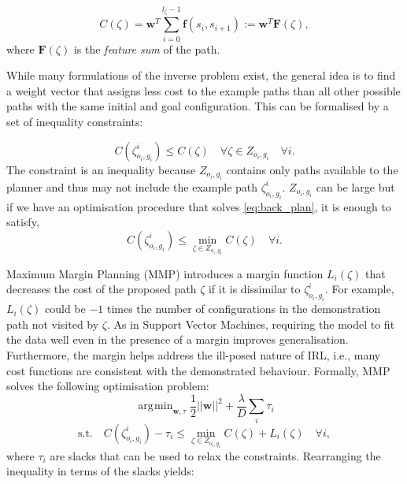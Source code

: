 \documentclass[a4paper,11pt]{report}
\DeclareMathOperator*{\argmin}{\arg\!\min}
\begin{document}
\begin{equation}
	C(\zeta) = \mathbf{w}^T\sum_{i=0}^{l_{\zeta}-1} \mathbf{f}(s_i,s_{i+1}) := \mathbf{w}^T \mathbf{F}(\zeta),
\end{equation}
where $\mathbf{F}(\zeta)$ is the \emph{feature sum} of the path.

While many formulations of the inverse problem exist, the general idea is to find a weight vector that assigns less cost to the example paths than all other possible paths with the same initial and goal configuration.  This can be formalised by a set of inequality constraints:

\begin{equation}
	C(\zeta^i_{o_i,g_i}) \leq  C(\zeta) \quad \forall \zeta \in Z_{o_i,g_i}  \quad \forall i. \label{eq:const1}
\end{equation}
The constraint is an inequality because $Z_{o_i,g_i}$ contains only paths available to the planner and thus may not include the example path $\zeta^i_{o_i,g_i}$.
$Z_{o_i,g_i}$ can be large but if we have an optimisation procedure that solves \eqref{eq:back_plan}, it is enough to satisfy, 
\begin{equation}
	C(\zeta^i_{o_i,g_i}) \leq \min_{\zeta \in Z_{o_i,g_i}} C(\zeta) \quad \forall i. \label{eq:const}
\end{equation}

Maximum Margin Planning (MMP) \cite{ratliff2006maximum} introduces a margin function $L_i(\zeta)$ that decreases the cost of the proposed path $\zeta$ if it is dissimilar to $\zeta^i_{o_i,g_i}$. For example, $L_i(\zeta)$ could be $-1$ times the number of configurations in the demonstration path not visited by $\zeta$. As in Support Vector Machines, requiring the model to fit the data well even in the presence of a margin improves generalisation. Furthermore, the margin helps address the ill-posed nature of IRL, i.e., many cost functions are consistent with the demonstrated behaviour. Formally, MMP solves the following optimisation problem:
\begin{equation}
	\argmin_{\mathbf{w},\tau} \frac{1}{2}||\mathbf{w}||^2 + \frac{\lambda}{D} \sum_i \tau_i \label{eq:mas_marg}
\end{equation}
\begin{equation}
	\text{s.t.} \quad C(\zeta^i_{o_i,g_i}) - \tau_i \leq \min_{\zeta \in Z_{o_i,g_i}} C(\zeta) + L_i(\zeta) \quad \forall i,
\end{equation}
where $\tau_i$ are slacks that can be used to relax the constraints. Rearranging the inequality in terms of the slacks yields:
\end{document}
